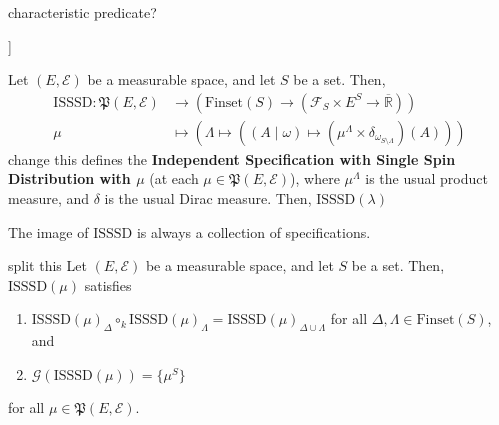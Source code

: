 \begin{definition}
    \label{def:productProbabilityMeasure}

    characteristic predicate?
\end{definition}

\begin{definition}[Independent Specification with Single Spin Distribution [ISSSD]]
    \label{def:ISSSD}
    
    Let $(E,\mathcal{E})$ be a measurable space, and let $S$ be a set. Then,
    \begin{align*}
        \text{ISSSD}:\mathfrak{P}(E,\mathcal{E})&\to\left(\text{Finset}(S)\to\left(\mathcal{F}_S\times E^S\to\overline{\mathbb{R}}\right)\right)\\
        \mu&\mapsto\left(\Lambda\mapsto\left((A\mid\omega)\mapsto(\mu^\Lambda\times\delta_{\omega_{S\setminus\Lambda}})(A)\right)\right)
    \end{align*}
    change this
    defines the \textbf{Independent Specification with Single Spin Distribution with $\mu$} (at each $\mu\in\mathfrak{P}(E,\mathcal{E})$), where $\mu^\Lambda$ is the usual product measure, and $\delta$ is the usual Dirac measure. Then, $\text{ISSSD}(\lambda)$ 
\end{definition}

\begin{lemma}
    \label{lem:ISSSDSpecification}
    The image of $\text{ISSSD}$ is always a collection of specifications.
\end{lemma}

\begin{lemma}
    \label{lem:basicPropISSSD}
    split this
    Let $(E,\mathcal{E})$ be a measurable space, and let $S$ be a set. Then, $\text{ISSSD}(\mu)$ satisfies
    \begin{enumerate}
        \item $\text{ISSSD}(\mu)_\Delta\circ_k\text{ISSSD}(\mu)_\Lambda=\text{ISSSD}(\mu)_{\Delta\cup\Lambda}$ for all $\Delta,\Lambda\in\text{Finset}(S)$, and
        \item $\mathcal{G}(\text{ISSSD}(\mu))=\{\mu^S\}$
    \end{enumerate}
    for all $\mu\in\mathfrak{P}(E,\mathcal{E})$.
\end{lemma}